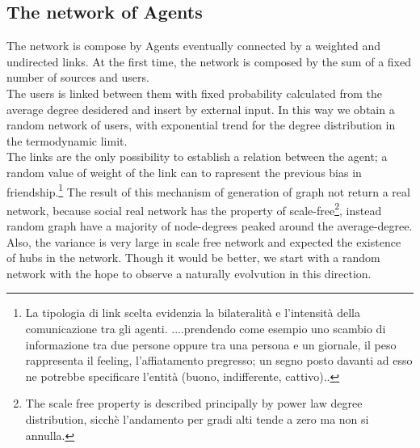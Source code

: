 \documentclass[11pt]{article} %
\begin{document}
\subsection{The network of Agents}
The network is compose by Agents eventually connected by a weighted and undirected links.
At the first time, the network is composed by the sum of a fixed number of sources and users. \\The users is linked between them with fixed probability calculated from the average degree desidered and insert by external input. In this way we obtain a random network of users, with exponential trend for the degree distribution in the termodynamic limit.\\ The links are the only possibility to establish a relation between the agent; a random value of weight of the link can to rapresent the previous bias in friendship.\footnote{La tipologia di link scelta evidenzia la bilateralità e l’intensità della comunicazione tra gli agenti.   ....prendendo come esempio uno scambio di informazione tra due persone oppure tra una persona e un giornale, il peso rappresenta il feeling, l’affiatamento pregresso; un segno posto davanti ad esso ne potrebbe specificare l’entità (buono, indifferente, cattivo)..}
 The result of this mechanism of generation of graph not return a real network, because social real network has the property of scale-free\footnote{The scale free property is described principally by power law degree distribution, sicchè l'andamento per gradi alti tende a zero ma non si annulla. },
 instead random graph have a majority of node-degrees peaked around the average-degree. Also, the variance is very large in scale free network and expected the existence of hubs in the network. Though it would be better, we start with a random network with the hope to observe a naturally evolvution in this direction.
\\
\end{document}
